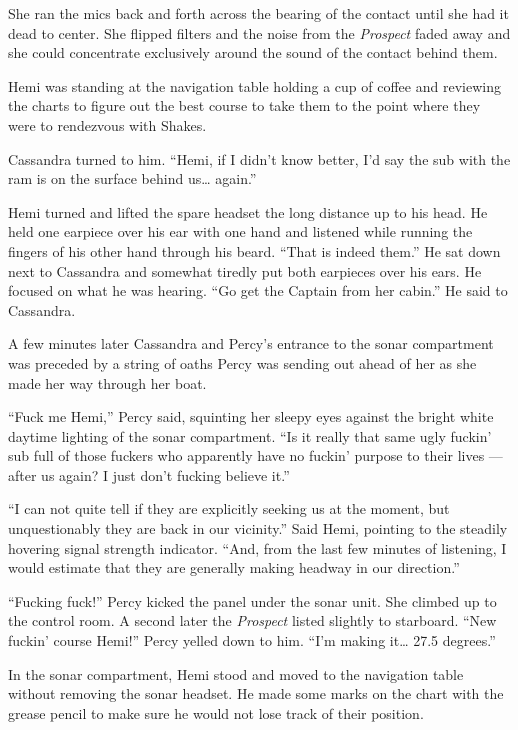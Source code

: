 \documentclass[]{scrbook}
\begin{document}
She ran the mics back and forth across the bearing of the contact until
she had it dead to center. She flipped filters and the noise from the
\emph{Prospect} faded away and she could concentrate exclusively around
the sound of the contact behind them.

Hemi was standing at the navigation table holding a cup of coffee and
reviewing the charts to figure out the best course to take them to the
point where they were to rendezvous with Shakes.

Cassandra turned to him. ``Hemi, if I didn't know better, I'd say the
sub with the ram is on the surface behind us\ldots{} again.''

Hemi turned and lifted the spare headset the long distance up to his
head. He held one earpiece over his ear with one hand and listened while
running the fingers of his other hand through his beard. ``That is
indeed them.'' He sat down next to Cassandra and somewhat tiredly put
both earpieces over his ears. He focused on what he was hearing. ``Go
get the Captain from her cabin.'' He said to Cassandra.

A few minutes later Cassandra and Percy's entrance to the sonar
compartment was preceded by a string of oaths Percy was sending out
ahead of her as she made her way through her boat.

``Fuck me Hemi,'' Percy said, squinting her sleepy eyes against the
bright white daytime lighting of the sonar compartment. ``Is it really
that same ugly fuckin' sub full of those fuckers who apparently have no
fuckin' purpose to their lives --- after us again? I just don't fucking
believe it.''

``I can not quite tell if they are explicitly seeking us at the moment,
but unquestionably they are back in our vicinity.'' Said Hemi, pointing
to the steadily hovering signal strength indicator. ``And, from the last
few minutes of listening, I would estimate that they are generally
making headway in our direction.''

``Fucking fuck!'' Percy kicked the panel under the sonar unit. She
climbed up to the control room. A second later the \emph{Prospect}
listed slightly to starboard. ``New fuckin' course Hemi!'' Percy yelled
down to him. ``I'm making it\ldots{} 27.5 degrees.''

In the sonar compartment, Hemi stood and moved to the navigation table
without removing the sonar headset. He made some marks on the chart with
the grease pencil to make sure he would not lose track of their
position.
\end{document}

